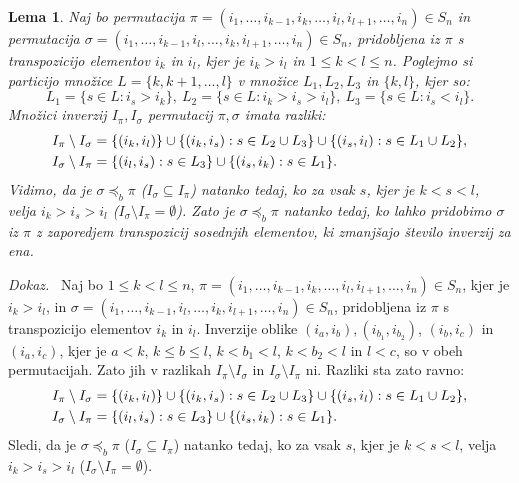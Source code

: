 \documentclass[a4paper, 12pt]{book}
\newtheorem{lema}{Lema}[chapter]
\newenvironment{dokaz}{\emph{Dokaz.}\ }{\hspace{\fill}{$\Box$}}
\begin{document}
\begin{lema}
    Naj bo permutacija $\pi = (i_1, \dots, i_{k-1}, i_k, \dots, i_l, i_{l+1}, \dots, i_n) \in S_n$ in permutacija $\sigma = (i_1, \dots, i_{k-1}, i_l, \dots, i_k, i_{l+1}, \dots, i_n) \in S_n$, pridobljena iz $\pi$ s transpozicijo elementov $i_k$ in $i_l$, kjer je $i_k > i_l$ in $1 \leq k < l \leq n$. Poglejmo si particijo množice $L = \{ k, k+ 1, \dots, l\}$ v množice $L_1, L_2, L_3$ in $\{ k, l \}$, kjer so:
    \[
        L_1 = \{ s \in L: i_s > i_k \}, \ L_2 = \{ s \in L: i_k > i_s > i_l \}, \ L_3 = \{ s \in L: i_s < i_l \}.
    \]
    Množici inverzij $I_{\pi}, I_{\sigma}$ permutacij $\pi, \sigma$ imata razliki:
    \begin{align}
        I_{\pi} \setminus I_{\sigma} &= \{ (i_k, i_l) \} \cup \{ (i_k, i_s): s \in L_2 \cup L_3 \} \cup \{ (i_s, i_l): s \in L_1 \cup L_2 \}, \notag \\
        I_{\sigma} \setminus I_{\pi} &= \{ (i_l, i_s): s \in L_3 \} \cup \{ (i_s, i_k): s \in L_1 \}. \notag
    \end{align}
    Vidimo, da je $\sigma \preceq_b \pi$ ($I_{\sigma} \subseteq I_{\pi}$) natanko tedaj, ko za vsak $s$, kjer je $k < s < l$, velja $i_k > i_s > i_l$ ($I_{\sigma} \setminus I_{\pi} = \emptyset$). Zato je $\sigma \preceq_b \pi$ natanko tedaj, ko lahko pridobimo $\sigma$ iz $\pi$ z zaporedjem transpozicij sosednjih elementov, ki zmanjšajo število inverzij za ena.
\end{lema}
\begin{dokaz}
    Naj bo $1 \leq k < l \leq n$, $\pi = (i_1, \dots, i_{k-1}, i_k, \dots, i_l, i_{l+1}, \dots, i_n) \in S_n$, kjer je $i_k > i_l$, in $\sigma = (i_1, \dots, i_{k-1}, i_l, \dots, i_k, i_{l+1}, \dots, i_n) \in S_n$, pridobljena iz $\pi$ s transpozicijo elementov $i_k$ in $i_l$. Inverzije oblike $(i_a, i_b), (i_{b_1}, i_{b_2})$,  $(i_b, i_c)$ in $(i_a, i_c)$, kjer je $a < k$, $k \leq b \leq l$, $k < b_1 < l$, $k < b_2 < l$ in $l < c$, so v obeh permutacijah. Zato jih v razlikah $I_{\pi} \setminus I_{\sigma}$ in $I_{\sigma} \setminus I_{\pi}$ ni. Razliki sta zato ravno:
    \begin{align}
        I_{\pi} \setminus I_{\sigma} &= \{ (i_k, i_l) \} \cup \{ (i_k, i_s): s \in L_2 \cup L_3 \} \cup \{ (i_s, i_l): s \in L_1 \cup L_2 \}, \notag \\
        I_{\sigma} \setminus I_{\pi} &= \{ (i_l, i_s): s \in L_3 \} \cup \{ (i_s, i_k): s \in L_1 \}. \notag
    \end{align}
    Sledi, da je $\sigma \preceq_b \pi$ ($I_{\sigma} \subseteq I_{\pi}$) natanko tedaj, ko za vsak $s$, kjer je $k < s < l$, velja $i_k > i_s > i_l$ ($I_{\sigma} \setminus I_{\pi} = \emptyset$).
\end{dokaz}
\end{document}
